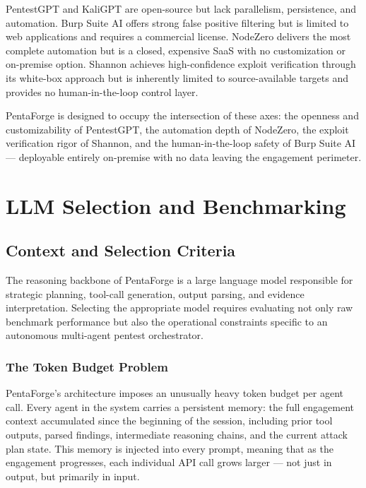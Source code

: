 \documentclass[12pt,a4paper]{report}
\begin{document}
PentestGPT and KaliGPT are open-source but lack parallelism, persistence, and
automation. Burp Suite AI offers strong false positive filtering but is limited
to web applications and requires a commercial license. NodeZero delivers the most
complete automation but is a closed, expensive SaaS with no customization or
on-premise option. Shannon achieves high-confidence exploit verification through
its white-box approach but is inherently limited to source-available targets and
provides no human-in-the-loop control layer.

PentaForge is designed to occupy the intersection of these axes: the openness
and customizability of PentestGPT, the automation depth of NodeZero, the exploit
verification rigor of Shannon, and the human-in-the-loop safety of Burp Suite AI
--- deployable entirely on-premise with no data leaving the engagement perimeter.

\section{LLM Selection and Benchmarking}

\subsection{Context and Selection Criteria}

The reasoning backbone of PentaForge is a large language model responsible for
strategic planning, tool-call generation, output parsing, and evidence
interpretation. Selecting the appropriate model requires evaluating not only raw
benchmark performance but also the operational constraints specific to an
autonomous multi-agent pentest orchestrator.

\subsubsection*{The Token Budget Problem}

PentaForge's architecture imposes an unusually heavy token budget per agent call.
Every agent in the system carries a persistent memory: the full engagement context
accumulated since the beginning of the session, including prior tool outputs, parsed
findings, intermediate reasoning chains, and the current attack plan state. This
memory is injected into every prompt, meaning that as the engagement progresses,
each individual API call grows larger --- not just in output, but primarily in input.
\end{document}
